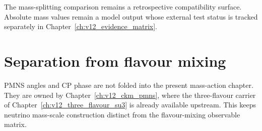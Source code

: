 The mass-splitting comparison remains a retrospective compatibility surface.
Absolute mass values remain a model output whose external test status is tracked
separately in Chapter~\ref{ch:v12_evidence_matrix}.

\section{Separation from flavour mixing}
PMNS angles and CP phase are not folded into the present mass-action chapter.
They are owned by Chapter~\ref{ch:v12_ckm_pmns}, where the three-flavour carrier
of Chapter~\ref{ch:v12_three_flavour_su3} is already available upstream. This
keeps neutrino mass-scale construction distinct from the flavour-mixing
observable matrix.
